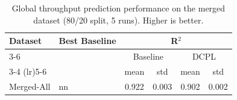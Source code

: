 \begin{table}[t]
\centering
\small
\setlength{\tabcolsep}{5pt}
\renewcommand{\arraystretch}{1.2}
\begin{tabular}{llcccc}
\toprule
\textbf{Dataset} & \textbf{Best Baseline} & \multicolumn{4}{c}{\textbf{R$^2$}} \\
\cmidrule(lr){3-6}
 &  & \multicolumn{2}{c}{Baseline} & \multicolumn{2}{c}{DCPL} \\
\cmidrule(lr){3-4} \cmidrule(lr){5-6}
 &  & mean & std & mean & std \\
\midrule
Merged-All & nn & 0.922 & 0.003 & 0.902 & 0.002 \\
\bottomrule
\end{tabular}
\caption{Global throughput prediction performance on the merged dataset (80/20 split, 5 runs). Higher is better.}
\label{tab:global_r2_baseline_vs_dcpl}
\end{table}
